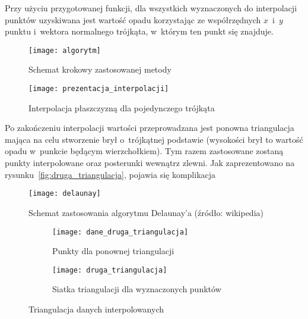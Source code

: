 Przy użyciu przygotowanej funkcji, dla wszystkich wyznaczonych do interpolacji punktów uzyskiwana jest wartość opadu korzystając ze współrzędnych $x$~i~$y$ punktu i~wektora normalnego trójkąta, w~którym ten punkt się znajduje.

\begin{figure}[ht]
	\centering
	\texttt{[image: algorytm]}
	\caption{Schemat krokowy zastosowanej metody}
	\label{fig:algorytm}
\end{figure}

\begin{figure}[ht]
	\centering
	\texttt{[image: prezentacja\_interpolacji]}
	\caption{Interpolacja płaszczyzną dla pojedynczego trójkąta}
	\label{fig:plaszczyzna_interpolacji}
\end{figure}

Po zakończeniu interpolacji wartości przeprowadzana jest ponowna triangulacja mająca na celu stworzenie brył o~trójkątnej podstawie (wysokości brył to wartość opadu w~punkcie będącym wierzchołkiem). Tym razem zastosowane zostaną punkty interpolowane oraz posterunki wewnątrz zlewni. Jak zaprezentowano na rysunku~\ref{fig:druga_triangulacja}, pojawia się komplikacja


\begin{figure}[ht]
	\centering
	\texttt{[image: delaunay]}
	\caption{Schemat zastosowania algorytmu Delaunay'a (źródło: wikipedia)}
	\label{fig:delaunay}
\end{figure}

\begin{figure}[ht]
	\centering
\begin{subfigure}[t]{.5\textwidth}
	\centering
	\texttt{[image: dane\_druga\_triangulacja]}
	\caption{Punkty dla ponownej triangulacji}
	\label{fig:dane_wejsciowe}
\end{subfigure}	
	\begin{subfigure}[t]{0.5\textwidth}
	\centering
	\texttt{[image: druga\_triangulacja]}
	\caption{Siatka triangulacji dla wyznaczonych punktów}
	\label{fig:druga_triagnulacja}
\end{subfigure}	
\caption{Triangulacja danych interpolowanych}
	
\end{figure}